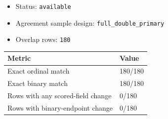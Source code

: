 \documentclass{article}
\providecommand{\tightlist}{%
  \setlength{\itemsep}{0pt}\setlength{\parskip}{0pt}}
\begin{document}
\begin{itemize}
\tightlist
\item
  Status: \texttt{available}
\item
  Agreement sample design: \texttt{full\_double\_primary}
\item
  Overlap rows: \texttt{180}
\end{itemize}

\begin{longtable}[]{@{}ll@{}}
\toprule\noalign{}
Metric & Value \\
\midrule\noalign{}
\endhead
\bottomrule\noalign{}
\endlastfoot
Exact ordinal match & 180/180 \\
Exact binary match & 180/180 \\
Rows with any scored-field change & 0/180 \\
Rows with binary-endpoint change & 0/180 \\
\end{longtable}
\end{document}
